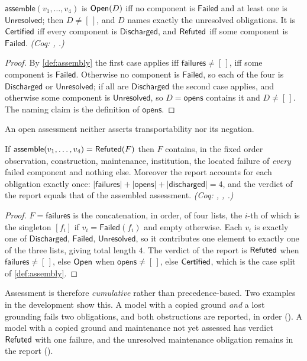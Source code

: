 \begin{prop}\label{prop:open}
$\mathsf{assemble}(v_1,\dots,v_4)$ is $\mathsf{Open}(D)$ iff no component is $\mathsf{Failed}$ and at least one is $\mathsf{Unresolved}$; then $D \neq [\,]$, and $D$ names exactly the unresolved obligations. It is $\mathsf{Certified}$ iff every component is $\mathsf{Discharged}$, and $\mathsf{Refuted}$ iff some component is $\mathsf{Failed}$. \emph{(Coq: , .)}
\end{prop}
\begin{proof}
By \cref{def:assembly} the first case applies iff $\mathsf{failures} \neq [\,]$, iff some component is $\mathsf{Failed}$. Otherwise no component is $\mathsf{Failed}$, so each of the four is $\mathsf{Discharged}$ or $\mathsf{Unresolved}$; if all are $\mathsf{Discharged}$ the second case applies, and otherwise some component is $\mathsf{Unresolved}$, so $D = \mathsf{opens}$ contains it and $D \neq [\,]$. The naming claim is the definition of $\mathsf{opens}$.
\end{proof}
An open assessment neither asserts transportability nor its negation.

\begin{prop}\label{prop:accumulate}
If $\mathsf{assemble}(v_1,\dots,v_4) = \mathsf{Refuted}(F)$ then $F$ contains, in the fixed order observation, construction, maintenance, institution, the located failure of \emph{every} failed component and nothing else. Moreover the report accounts for each obligation exactly once: $|\mathsf{failures}| + |\mathsf{opens}| + |\mathsf{discharged}| = 4$, and the verdict of the report equals that of the assembled assessment. \emph{(Coq: , , .)}
\end{prop}
\begin{proof}
$F = \mathsf{failures}$ is the concatenation, in order, of four lists, the $i$-th of which is the singleton $[f_i]$ if $v_i = \mathsf{Failed}(f_i)$ and empty otherwise. Each $v_i$ is exactly one of $\mathsf{Discharged}$, $\mathsf{Failed}$, $\mathsf{Unresolved}$, so it contributes one element to exactly one of the three lists, giving total length $4$. The verdict of the report is $\mathsf{Refuted}$ when $\mathsf{failures} \neq [\,]$, else $\mathsf{Open}$ when $\mathsf{opens} \neq [\,]$, else $\mathsf{Certified}$, which is the case split of \cref{def:assembly}.
\end{proof}
Assessment is therefore \emph{cumulative} rather than precedence-based. Two examples in the development show this. A model with a copied ground \emph{and} a lost grounding fails two obligations, and both obstructions are reported, in order (). A model with a copied ground and maintenance not yet assessed has verdict $\mathsf{Refuted}$ with one failure, and the unresolved maintenance obligation remains in the report ().

